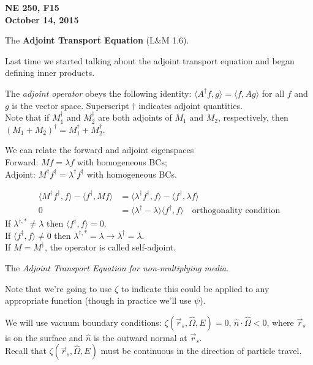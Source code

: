 \documentclass[12pt]{article}
\newcommand{\vOmega}{\ensuremath{\hat{\Omega}}}
\begin{document}
\begin{center}
{\bf NE 250, F15\\
October 14, 2015 
}
\end{center}

The \textbf{Adjoint Transport Equation} (L\&M 1.6).

Last time we started talking about the adjoint transport equation and began defining inner products. 

The \textit{adjoint operator} obeys the following identity: $\langle A^{\dagger}f, g\rangle = \langle f, Ag\rangle$ for all $f$ and $g$ is the vector space. Superscript $\dagger$ indicates adjoint quantities.\\
Note that if $M_1^{\dagger}$ and $M_2^{\dagger}$ are both adjoints of $M_1$ and $M_2$, respectively, then $(M_1 + M_2)^{\dagger}  = M_1^{\dagger} + M_2^{\dagger}$.

We can relate the forward and adjoint eigenspaces\\
Forward: $Mf = \lambda f$ with homogeneous BCs;\\
Adjoint: $M^{\dagger}f^{\dagger} = \lambda^{\dagger} f^{\dagger}$ with homogeneous BCs.

\begin{align*}
\langle M^{\dagger}f^{\dagger}, f\rangle - \langle f^{\dagger}, Mf\rangle &= \langle\lambda^{\dagger} f^{\dagger}, f\rangle - \langle f^{\dagger} ,\lambda f\rangle \\
0 &= \langle\lambda^{\dagger} - \lambda\rangle \langle f^{\dagger}, f\rangle \quad \text{orthogonality condition}
\end{align*}
%
If $\lambda^{\dagger, *} \neq \lambda$ then $\langle f^{\dagger}, f\rangle = 0$.\\
If $\langle f^{\dagger}, f\rangle \neq 0$ then $\lambda^{\dagger, *} = \lambda \rightarrow \lambda^{\dagger} = \lambda$.\\
If $M = M^{\dagger}$, the operator is called self-adjoint. 

The \textit{Adjoint Transport Equation for non-multiplying media}.

Note that we're going to use $\zeta$ to indicate this could be applied to any appropriate function (though in practice we'll use $\psi$).

We will use vacuum boundary conditions: $\zeta(\vec{r}_s, \vOmega, E) = 0$, $\hat{n} \cdot \vOmega < 0$, where $\vec{r}_s$ is on the surface and $\hat{n}$ is the outward normal at $\vec{r}_s$.\\
Recall that $\zeta(\vec{r}_s, \vOmega, E)$ must be continuous in the direction of particle travel.
\end{document}
